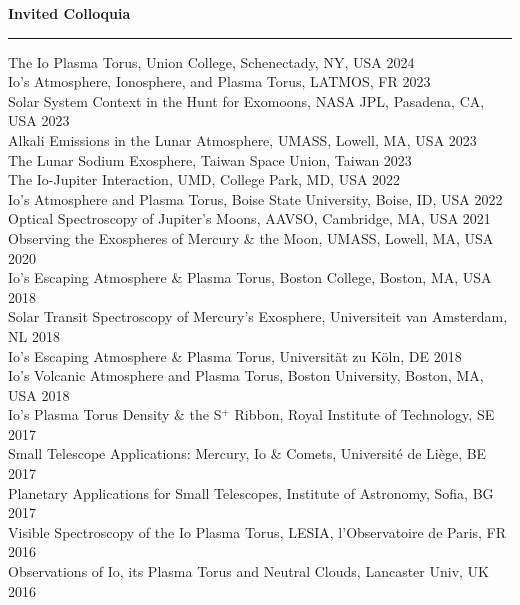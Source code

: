 \documentclass[12pt]{report}
\begin{document}
\vspace{2 mm}
\noindent\bf{Invited Colloquia}\rm \hspace*{\fill} \\
\rule{\textwidth}{1pt}
\noindent The Io Plasma Torus, Union College, Schenectady, NY, USA \hfill 2024\\
\noindent Io's Atmosphere, Ionosphere, and Plasma Torus, LATMOS, FR \hfill 2023\\
\noindent Solar System Context in the Hunt for Exomoons, NASA JPL, Pasadena, CA, USA \hfill 2023\\
\noindent Alkali Emissions in the Lunar Atmosphere, UMASS, Lowell, MA, USA \hfill 2023\\
\noindent The Lunar Sodium Exosphere, Taiwan Space Union, Taiwan \hfill 2023\\
\noindent The Io-Jupiter Interaction, UMD, College Park, MD, USA \hfill 2022\\
\noindent Io's Atmosphere and Plasma Torus, Boise State University, Boise, ID, USA \hfill 2022\\
\noindent Optical Spectroscopy of Jupiter's Moons, AAVSO, Cambridge, MA, USA \hfill 2021\\
\noindent Observing the Exospheres of Mercury \& the Moon, UMASS, Lowell, MA, USA \hfill 2020\\
\noindent Io's Escaping Atmosphere \& Plasma Torus, Boston College, Boston, MA, USA \hfill 2018\\
\noindent Solar Transit Spectroscopy of Mercury's Exosphere, Universiteit van Amsterdam, NL \hfill 2018\\
\noindent Io's Escaping Atmosphere \& Plasma Torus, Universit\"at zu K\"oln, DE \hfill 2018\\
\noindent Io's Volcanic Atmosphere and Plasma Torus, Boston University, Boston, MA, USA \hfill 2018\\
\noindent Io's Plasma Torus Density \& the S$^+$ Ribbon, Royal Institute of Technology, SE \hfill 2017\\
\noindent Small Telescope Applications: Mercury, Io \& Comets, Universit\'e de Li\`ege, BE \hfill 2017\\
\noindent Planetary Applications for Small Telescopes, Institute of Astronomy, Sofia, BG \hfill 2017\\
\noindent Visible Spectroscopy of the Io Plasma Torus, LESIA, l'Observatoire de Paris, FR \hfill 2016\\
\noindent Observations of Io, its Plasma Torus and Neutral Clouds, Lancaster Univ, UK \hfill 2016\\
\end{document}

